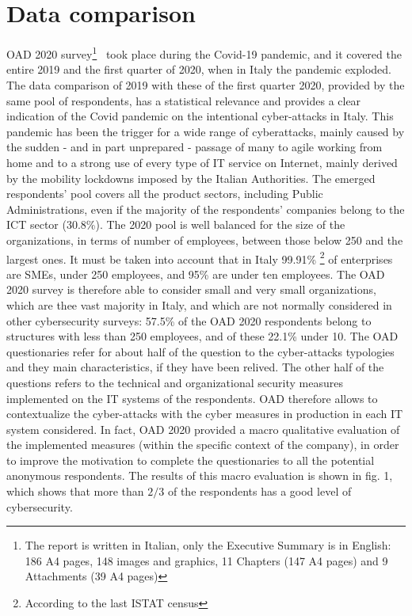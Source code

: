 \documentclass{easychair}
\begin{document}
\section{Data comparison}

OAD 2020 survey\footnote{The report is written in Italian, only the Executive Summary is in English: 186 A4 pages, 148 images and graphics, 11 Chapters
(147 A4 pages) and 9 Attachments (39 A4 pages)}~\cite{OAD_report_2020} took place during the Covid-19 pandemic, and it covered the entire 2019 and the first quarter 
of 2020, when in Italy the pandemic exploded. The data comparison of 2019 with these of the first quarter 2020, provided by the same pool of respondents, has a statistical relevance and provides a 
clear indication of the Covid pandemic on the intentional cyber-attacks in Italy. This pandemic has been the trigger for a wide range of cyberattacks, mainly 
caused by the sudden - and in part unprepared - passage of many to agile working from home and to a strong use of every type of IT service on Internet, mainly
derived by the mobility lockdowns imposed by the Italian Authorities. The emerged respondents’ pool covers all the product sectors, including Public Administrations,
even if the majority of the respondents’ companies belong to the ICT sector (30.8\%). The 2020 pool  is well balanced for the size of the organizations, in terms
of number of employees, between those below 250 and the largest ones. It must be taken into account that in Italy 99.91\%
\footnote{According to the last ISTAT census} %
of enterprises are SMEs, under 250 employees, and 95\% are under ten employees. The OAD 2020 survey is therefore able to consider small and 
very small organizations, which are thee vast majority in Italy, and which are not normally considered in other cybersecurity surveys: 57.5\% of the OAD 2020 respondents
belong to structures with less than 250 employees, and of these 22.1\% under 10. The OAD questionaries refer for about half of the question to the cyber-attacks 
typologies and they main characteristics, if they have been relived. The other half of the questions refers to the technical and organizational security measures implemented
on the IT systems of the respondents. OAD therefore allows to contextualize the cyber-attacks with the cyber measures in production in each IT system considered. 
In fact, OAD 2020 provided a macro qualitative evaluation of the implemented measures (within the specific context of the company), in order to improve the motivation to 
complete the questionaries to all the potential anonymous respondents. The results of this macro evaluation is shown in fig. 1, which shows that more than $ 2/3 $ of the 
respondents has a good level of cybersecurity.
\end{document}
